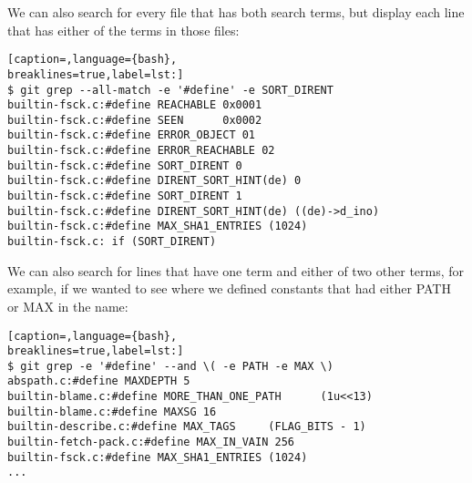 We can also search for every file that has both search terms, but display each
line that has either of the terms in those files:
\lstset{basicstyle=\scriptsize, numbers=none, captionpos=b, tabsize=4}
\begin{lstlisting}[caption=,language={bash},
breaklines=true,label=lst:]
$ git grep --all-match -e '#define' -e SORT_DIRENT
builtin-fsck.c:#define REACHABLE 0x0001
builtin-fsck.c:#define SEEN      0x0002
builtin-fsck.c:#define ERROR_OBJECT 01
builtin-fsck.c:#define ERROR_REACHABLE 02
builtin-fsck.c:#define SORT_DIRENT 0
builtin-fsck.c:#define DIRENT_SORT_HINT(de) 0
builtin-fsck.c:#define SORT_DIRENT 1
builtin-fsck.c:#define DIRENT_SORT_HINT(de) ((de)->d_ino)
builtin-fsck.c:#define MAX_SHA1_ENTRIES (1024)
builtin-fsck.c: if (SORT_DIRENT)
\end{lstlisting}

We can also search for lines that have one term and either of two other terms,
for example, if we wanted to see where we defined constants that had either
PATH or MAX in the name:
\lstset{basicstyle=\scriptsize, numbers=none, captionpos=b, tabsize=4}
\begin{lstlisting}[caption=,language={bash},
breaklines=true,label=lst:]
$ git grep -e '#define' --and \( -e PATH -e MAX \) 
abspath.c:#define MAXDEPTH 5
builtin-blame.c:#define MORE_THAN_ONE_PATH      (1u<<13)
builtin-blame.c:#define MAXSG 16
builtin-describe.c:#define MAX_TAGS     (FLAG_BITS - 1)
builtin-fetch-pack.c:#define MAX_IN_VAIN 256
builtin-fsck.c:#define MAX_SHA1_ENTRIES (1024)
...
\end{lstlisting}
